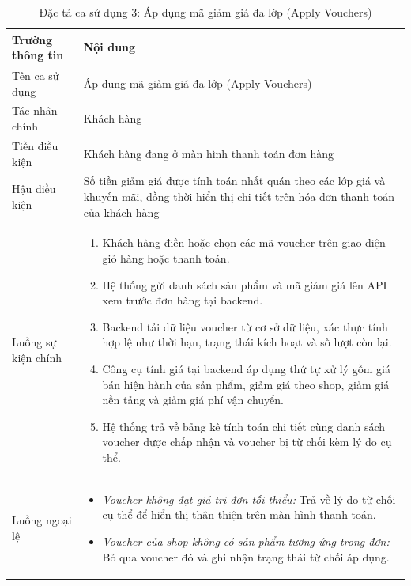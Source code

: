 \documentclass[../DoAn.tex]{subfiles}
\begin{document}
\begin{table}[H]
\centering
\caption{Đặc tả ca sử dụng 3: Áp dụng mã giảm giá đa lớp (Apply Vouchers)}
\label{table:uc3_voucher}
\renewcommand{\arraystretch}{1.4}
\begin{tabular}{|>{\columncolor{blue!6}\raggedright\arraybackslash}p{3.5cm}|>{\raggedright\arraybackslash}p{10.5cm}|}
\hline
\rowcolor{blue!18}
\textbf{Trường thông tin} & \textbf{Nội dung} \\
\hline
Tên ca sử dụng & Áp dụng mã giảm giá đa lớp (Apply Vouchers) \\
\hline
Tác nhân chính & Khách hàng \\
\hline
Tiền điều kiện & Khách hàng đang ở màn hình thanh toán đơn hàng \\
\hline
Hậu điều kiện & Số tiền giảm giá được tính toán nhất quán theo các lớp giá và khuyến mãi, đồng thời hiển thị chi tiết trên hóa đơn thanh toán của khách hàng \\
\hline
Luồng sự kiện chính &
\begin{minipage}[t]{10.3cm}
\vspace{3pt}
\begin{enumerate}[leftmargin=1.5em, topsep=0pt, parsep=0pt, itemsep=2pt, partopsep=0pt]
    \item Khách hàng điền hoặc chọn các mã voucher trên giao diện giỏ hàng hoặc thanh toán.
    \item Hệ thống gửi danh sách sản phẩm và mã giảm giá lên API xem trước đơn hàng tại backend.
    \item Backend tải dữ liệu voucher từ cơ sở dữ liệu, xác thực tính hợp lệ như thời hạn, trạng thái kích hoạt và số lượt còn lại.
    \item Công cụ tính giá tại backend áp dụng thứ tự xử lý gồm giá bán hiện hành của sản phẩm, giảm giá theo shop, giảm giá nền tảng và giảm giá phí vận chuyển.
    \item Hệ thống trả về bảng kê tính toán chi tiết cùng danh sách voucher được chấp nhận và voucher bị từ chối kèm lý do cụ thể.
\end{enumerate}
\vspace{3pt}
\end{minipage} \\
\hline
Luồng ngoại lệ &
\begin{minipage}[t]{10.3cm}
\vspace{3pt}
\begin{itemize}[leftmargin=1.5em, topsep=0pt, parsep=0pt, itemsep=2pt, partopsep=0pt]
    \item \textit{Voucher không đạt giá trị đơn tối thiểu:} Trả về lý do từ chối cụ thể để hiển thị thân thiện trên màn hình thanh toán.
    \item \textit{Voucher của shop không có sản phẩm tương ứng trong đơn:} Bỏ qua voucher đó và ghi nhận trạng thái từ chối áp dụng.
\end{itemize}
\vspace{3pt}
\end{minipage} \\
\hline
\end{tabular}
\end{table}
\end{document}
